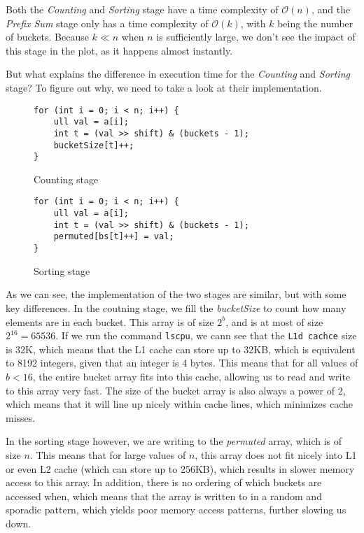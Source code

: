 \documentclass{article}
\begin{document}
Both the \textit{Counting} and \textit{Sorting} stage have a time complexity of \( \mathcal{O}\left(n\right) \), and the \textit{Prefix Sum} stage only has a time complexity of \( \mathcal{O}\left(k\right) \), with \( k \) being the number of buckets. Because \( k \ll n \) when \( n \) is sufficiently large, we don't see the impact of this stage in the plot, as it happens almost instantly.
\medskip

But what explains the difference in execution time for the \textit{Counting} and \textit{Sorting} stage? To figure out why, we need to take a look at their implementation.

\begin{figure}[h]
    \centering

    \begin{minipage}{0.47\textwidth}
        \begin{lstlisting}
for (int i = 0; i < n; i++) {
    ull val = a[i];
    int t = (val >> shift) & (buckets - 1);
    bucketSize[t]++;
}
        \end{lstlisting}
        \caption{Counting stage}
    \end{minipage}\hfill
    \begin{minipage}{0.47\textwidth}
        \begin{lstlisting}
for (int i = 0; i < n; i++) {
    ull val = a[i];                         
    int t = (val >> shift) & (buckets - 1);
    permuted[bs[t]++] = val;
}
        \end{lstlisting}
        \caption{Sorting stage}
    \end{minipage}
    \end{figure}

    As we can see, the implementation of the two stages are similar, but with some key differences. In the coutning stage, we fill the \textit{bucketSize} to count how many elements are in each bucket. This array is of size \( 2^{b} \), and is at most of size \( 2^{16} = 65536 \). If we run the command \texttt{lscpu}, we cann see that the \texttt{L1d cachce} size is 32K, which means that the L1 cache can store up to 32KB, which is equivalent to 8192 integers, given that an integer is 4 bytes. This means that for all values of \( b < 16\), the entire bucket array fits into this cache, allowing us to read and write to this array very fast. The size of the bucket array is also always a power of 2, which means that it will line up nicely within cache lines, which minimizes cache misses.
\medskip

In the sorting stage however, we are writing to the \textit{permuted} array, which is of size \( n \). This means that for large values of \( n \), this array does not fit nicely into L1 or even L2 cache (which can store up to 256KB), which results in slower memory access to this array. In addition, there is no ordering of which buckets are accessed when, which means that the array is written to in a random and sporadic pattern, which yields poor memory access patterns, further slowing us down.
\medskip
\end{document}
